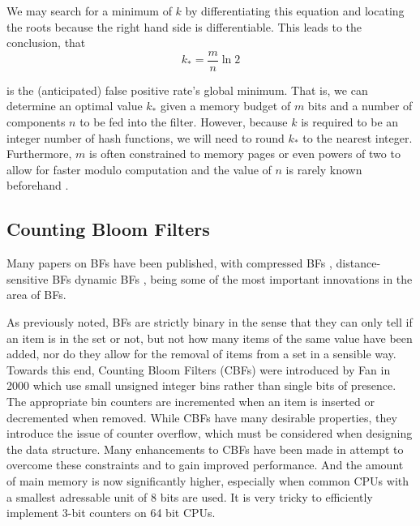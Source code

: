 \documentclass[sigconf]{acmart}
\begin{document}
We may search for a minimum of $k$ by differentiating this equation and locating the roots because the right hand side is differentiable. This leads to the conclusion, that
\begin{equation}
  k_{*} = \frac{m}{n} \ln{2}
\end{equation}

is the (anticipated) false positive rate's global minimum. That is, we can determine an optimal value $k_{*}$ given a memory budget of $m$ bits and a number of components $n$ to be fed into the filter. However, because $k$ is required to be an integer number of hash functions, we will need to round $k_{*}$ to the nearest integer. Furthermore, $m$ is often constrained to memory pages or even powers of two to allow for faster modulo computation and the value of $n$ is rarely known beforehand \cite{broder2004network}.



\subsection{Counting Bloom Filters}\label{section:cbf}
Many papers on BFs have been published, with compressed BFs \cite{mitzenmacher2002compressed}, distance-sensitive BFs \cite{kirsch2006distance} dynamic BFs \cite{guo2009dynamic}, being some of the most important innovations in the area of BFs.

As previously noted, BFs are strictly binary in the sense that they can only tell if an item is in the set or not, but not how many items of the same value have been added, nor do they allow for the removal of items from a set in a sensible way. Towards this end, Counting Bloom Filters (CBFs) were introduced by Fan in 2000 \cite{fan2000summary} which use small unsigned integer bins rather than single bits of presence. The appropriate bin counters are incremented when an item is inserted or decremented when removed.
While CBFs have many desirable properties, they introduce the issue of counter overflow, which must be considered when designing the data structure. Many enhancements to CBFs have been made in attempt to overcome these constraints and to gain improved performance. And the amount of main memory is now significantly higher, especially when common CPUs with a smallest adressable unit of 8 bits are used. It is very tricky to efficiently implement 3-bit counters on 64 bit CPUs.
\end{document}
